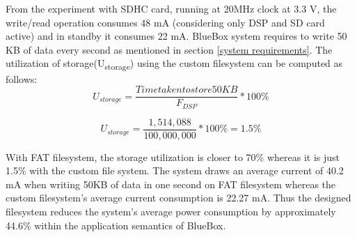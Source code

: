 From the experiment with SDHC card, running at 20MHz clock at 3.3 V, the write/read operation consumes 48 mA (considering only DSP and SD card active) and in standby it consumes 22 mA. BlueBox system requires to write 50 KB of data every second as mentioned in section \ref{system requirements}. The utilization of storage(U\textsubscript{storage}) using the custom filesystem can be computed as follows:
 \[U_{storage} = \frac{Time taken to store 50 KB}{
	F_{DSP}
} * 100 \%\]

 \[U_{storage} = \frac{1,514,088}{
	100,000,000
} * 100 \% = 1.5\%\]

 With FAT filesystem, the storage utilization is closer to 70\% whereas it is just 1.5\% with the custom file system.
 The system draws an average current of 40.2 mA when writing 50KB of data in one second on FAT filesystem whereas the custom filesystem's average current consumption is 22.27 mA. Thus the designed filesystem reduces the system's average power consumption by approximately 44.6\% within the application semantics of BlueBox. 
 
